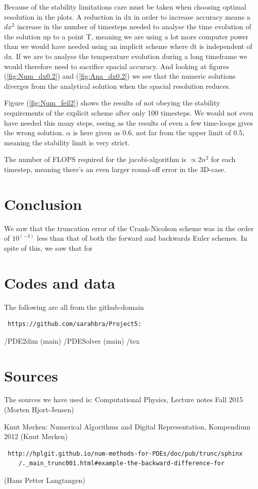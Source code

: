 \documentclass[a4paper,10pt]{article}
\begin{document}
Because of the stability limitations care must be taken when choosing optimal resolution in the plots. A reduction in dx in order to increase accuracy means a $dx^2$ increase in the number of timesteps needed to analyse the time evolution of the solution up to a point T, meaning we are using a lot more computer power than we would have needed using an implicit scheme where dt is independent of dx.
If we are to analyse the temperature evolution during a long timeframe we would therefore need to sacrifice spacial accuracy. And looking at figures (\ref{fig:Num_dx0.2}) and (\ref{fig:Ana_dx0.2}) we see that the numeric solutions diverges from the analytical solution when the spacial resolution reduces.

Figure (\ref{fig:Num_feil2}) shows the results of not obeying the stability requirements of the explicit scheme after only 100 timesteps. We would not even have needed this many steps, seeing as the results of even a few time-loops gives the wrong solution. $\alpha$ is here given as 0.6, not far from the upper limit of 0.5, meaning the stability limit is very strict.

The number of FLOPS required for the jacobi-algorithm is $\propto 2n^2$ for each timestep, meaning there's an even larger round-off error in the 3D-case.
\section{Conclusion}
We saw that the truncation error of the Crank-Nicolson scheme was in the order of $10^(-3)$ less than that of both the forward and backwards Euler schemes. In spite of this, we saw that for 

\section{Codes and data}
The following are all from the github-domain 
\begin{verbatim}
 https://github.com/sarahbra/Project5:
\end{verbatim}

/PDE2dim (main)
/PDESolver (main)
/tex

\section{Sources}
The sources we have used is:
Computational Physics, Lecture notes Fall 2015 (Morten Hjort-Jensen)

Knut Mørken: Numerical Algorithms and Digital Representation, Kompendium 2012 (Knut Mørken)

\begin{verbatim}
 http://hplgit.github.io/num-methods-for-PDEs/doc/pub/trunc/sphinx
	/._main_trunc001.html#example-the-backward-difference-for  
\end{verbatim}
    (Hans Petter Langtangen)
\end{document}
